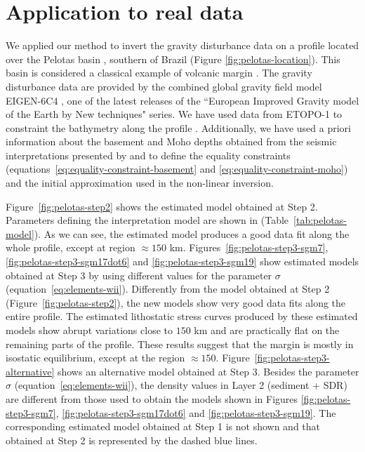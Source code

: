 \documentclass[manuscript,revised]{geophysics}
\begin{document}
\section{Application to real data}


We applied our method to invert the gravity disturbance data 
on a profile located over the Pelotas basin
\citep{stica-etal2014}, southern of Brazil (Figure \ref{fig:pelotas-location}). This basin is 
considered a classical example of volcanic margin \citep{geoffroy2005}.
The gravity disturbance data are provided by the combined global gravity field model EIGEN-6C4
\citep{forste2014}, one of the latest releases of the ``European Improved Gravity model of 
the Earth by New techniques" series.
We have used data from ETOPO-1 to constraint the bathymetry along the profile
\citep{amante-eakins2009}.
Additionally, we have used a priori information about the basement and Moho depths
obtained from the seismic interpretations presented by \citet{stica-etal2014} and
\citet{zalan2015} to define the equality constraints 
(equations~\ref{eq:equality-constraint-basement} and \ref{eq:equality-constraint-moho})
and the initial approximation used in the non-linear inversion. 

Figure~\ref{fig:pelotas-step2} shows the estimated model obtained at Step 2.
Parameters defining the interpretation model are shown in 
(Table~\ref{tab:pelotas-model}).
As we can see, the estimated model produces a good data fit along the whole
profile, except at region $\approx 150$ km.
Figures~\ref{fig:pelotas-step3-sgm7}, \ref{fig:pelotas-step3-sgm17dot6} and 
\ref{fig:pelotas-step3-sgm19} show estimated models obtained at
Step 3 by using different values for the parameter $\sigma$
(equation~\ref{eq:elements-wii}).
Differently from the model obtained at Step 2 (Figure~\ref{fig:pelotas-step2}), 
the new models show very good data fits along the entire profile.
The estimated lithostatic stress curves produced by these estimated models 
show abrupt variations close to $150$ km and are practically flat on the remaining parts
of the profile. These results suggest that the margin is mostly in isostatic 
equilibrium, except at the region $\approx 150$.
Figure~\ref{fig:pelotas-step3-alternative} shows an alternative 
model obtained at Step 3. 
Besides the parameter $\sigma$ (equation~\ref{eq:elements-wii}),
the density values in Layer 2 (sediment + SDR) are different from 
those used to obtain the models shown in Figures \ref{fig:pelotas-step3-sgm7},
\ref{fig:pelotas-step3-sgm17dot6} and \ref{fig:pelotas-step3-sgm19}.
The corresponding estimated model obtained at Step 1 is not shown and
that obtained at Step 2 is represented by the dashed blue lines.
\end{document}
